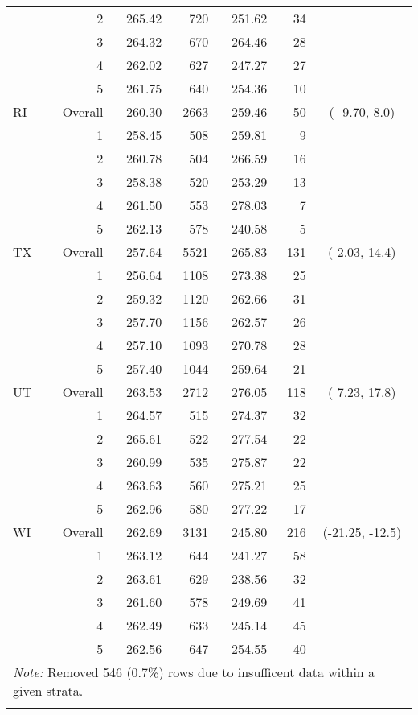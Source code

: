 \begin{longtable}{lrrr@{\extracolsep{.25cm}}rrc}
   & 2 & 265.42 & 720 & 251.62 &  34 &  \\ 
   & 3 & 264.32 & 670 & 264.46 &  28 &  \\ 
   & 4 & 262.02 & 627 & 247.27 &  27 &  \\ 
   & 5 & 261.75 & 640 & 254.36 &  10 &  \\ 
   \hline
RI & Overall & 260.30 & 2663 & 259.46 &  50 & ( -9.70,   8.0) \\ 
   & 1 & 258.45 & 508 & 259.81 &   9 &  \\ 
   & 2 & 260.78 & 504 & 266.59 &  16 &  \\ 
   & 3 & 258.38 & 520 & 253.29 &  13 &  \\ 
   & 4 & 261.50 & 553 & 278.03 &   7 &  \\ 
   & 5 & 262.13 & 578 & 240.58 &   5 &  \\ 
   \hline
TX & Overall & 257.64 & 5521 & 265.83 & 131 & (  2.03,  14.4) \\ 
   & 1 & 256.64 & 1108 & 273.38 &  25 &  \\ 
   & 2 & 259.32 & 1120 & 262.66 &  31 &  \\ 
   & 3 & 257.70 & 1156 & 262.57 &  26 &  \\ 
   & 4 & 257.10 & 1093 & 270.78 &  28 &  \\ 
   & 5 & 257.40 & 1044 & 259.64 &  21 &  \\ 
   \hline
UT & Overall & 263.53 & 2712 & 276.05 & 118 & (  7.23,  17.8) \\ 
   & 1 & 264.57 & 515 & 274.37 &  32 &  \\ 
   & 2 & 265.61 & 522 & 277.54 &  22 &  \\ 
   & 3 & 260.99 & 535 & 275.87 &  22 &  \\ 
   & 4 & 263.63 & 560 & 275.21 &  25 &  \\ 
   & 5 & 262.96 & 580 & 277.22 &  17 &  \\ 
   \hline
WI & Overall & 262.69 & 3131 & 245.80 & 216 & (-21.25, -12.5) \\ 
   & 1 & 263.12 & 644 & 241.27 &  58 &  \\ 
   & 2 & 263.61 & 629 & 238.56 &  32 &  \\ 
   & 3 & 261.60 & 578 & 249.69 &  41 &  \\ 
   & 4 & 262.49 & 633 & 245.14 &  45 &  \\ 
   & 5 & 262.56 & 647 & 254.55 &  40 &  \\ 
   \hline \multicolumn{7}{l}{\textit{Note:} Removed 546 (0.7\%) rows due to insufficent data within a given strata.} \\\hline
\label{g8read-mlpsa-lr}
\end{longtable}
